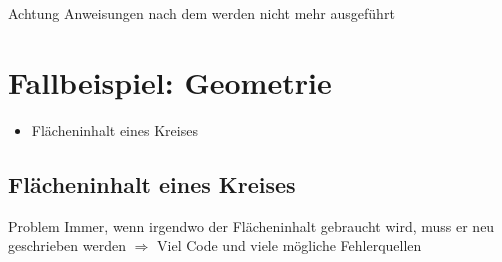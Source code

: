 \begin{frame}
    \slidehead

    \begin{block}{Achtung}
        Anweisungen nach dem  werden nicht mehr ausgeführt
    \end{block}
\end{frame}

\livecoding


\subtitle{Kapitel 6: wie Funktionen funktionieren}


\section{Fallbeispiel: Geometrie}
\begin{frame}
    \slidehead

    \begin{figure}
        \centering
    \end{figure}
    \vspace{-10mm}
    \begin{itemize}
        \item Flächeninhalt eines Kreises
    \end{itemize}
\end{frame}

\subsection{Flächeninhalt eines Kreises}
\begin{frame}
    \slidehead

    \begin{block}{Problem}
        Immer, wenn irgendwo der Flächeninhalt gebraucht wird, muss er neu geschrieben werden $\Rightarrow$ Viel Code und viele mögliche Fehlerquellen
    \end{block}
\end{frame}

